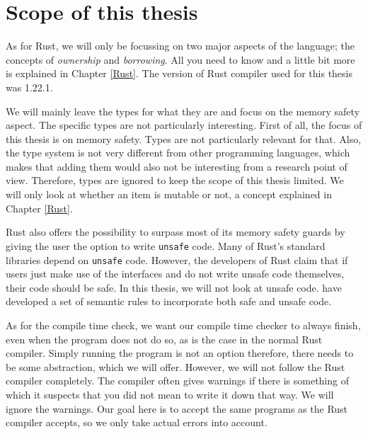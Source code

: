 



\section{Scope of this thesis}
As for Rust, we will only be focussing on two major aspects of the language; the concepts of \emph{ownership} and \emph{borrowing}. All you need to know and a little bit more is explained in Chapter \ref{Rust}. The version of Rust compiler used for this thesis was 1.22.1. 

We will mainly leave the types for what they are and focus on the memory safety aspect. The specific types are not particularly interesting. First of all, the focus of this thesis is on memory safety. Types are not particularly relevant for that. Also, the type system is not very different from other programming languages, which makes that adding them would also not be interesting from a research point of view. Therefore, types are ignored to keep the scope of this thesis limited. We will only look at whether an item is mutable or not, a concept explained in Chapter \ref{Rust}. 

Rust also offers the possibility to surpass most of its memory safety guards by giving the user the option to write \texttt{unsafe} code. Many of Rust's standard libraries depend on \texttt{unsafe} code. However, the developers of Rust claim that if users just make use of the interfaces and do not write unsafe code themselves, their code should be safe. In this thesis, we will not look at unsafe code. \cite{jung2017rustbelt} have developed a set of semantic rules to incorporate both safe and unsafe code. 

As for the compile time check, we want our compile time checker to always finish, even when the program does not do so, as is the case in the normal Rust compiler. Simply running the program is not an option therefore, there needs to be some abstraction, which we will offer. However, we will not follow the Rust compiler completely. The compiler often gives warnings if there is something of which it suspects that you did not mean to write it down that way. We will ignore the warnings. Our goal here is to accept the same programs as the Rust compiler accepts, so we only take actual errors into account. 

